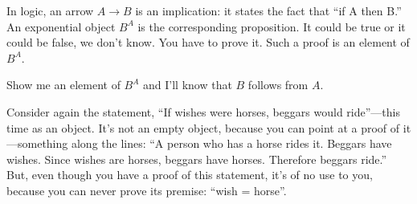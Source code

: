 \documentclass[DaoFP]{subfiles}
\begin{document}
In logic, an arrow $ A \to B$ is an implication: it states the fact that ``if A then B.'' An exponential object $ B^A$ is the corresponding proposition. It could be true or it could be false, we don't know. You have to prove it. Such a proof is an element of $ B^A$. 

Show me an element of $ B^A$ and I'll know that $ B$ follows from $ A$.

Consider again the statement, ``If wishes were horses, beggars would ride''---this time as an object. It's not an empty object, because you can point at a proof of it---something along the lines: ``A person who has a horse rides it. Beggars have wishes. Since wishes are horses, beggars have horses. Therefore beggars ride.'' But, even though you have a proof of this statement, it's of no use to you, because you can never prove its premise: ``wish = horse''. 
\end{document}
